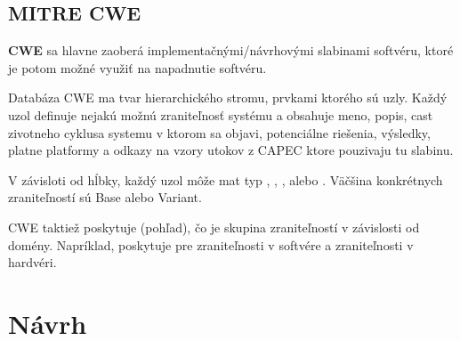 \documentclass[11pt]{article}
\begin{document}
\subsection{MITRE CWE}

\textbf{CWE} sa hlavne zaoberá implementačnými/návrhovými slabinami softvéru, ktoré je potom možné využiť na napadnutie softvéru.

Databáza CWE ma tvar hierarchického stromu, prvkami ktorého sú uzly. Každý uzol definuje nejakú možnú zraniteľnosť systému a obsahuje meno, popis, cast zivotneho cyklusa systemu v ktorom sa objavi, potenciálne riešenia, výsledky, platne platformy a odkazy na vzory utokov z CAPEC ktore pouzivaju tu slabinu.

V závisloti od hĺbky, každý uzol môže mat typ , , , alebo . Väčšina konkrétnych zraniteľností sú Base alebo Variant.

CWE taktiež poskytuje  (pohľad), čo je skupina zraniteľností v závislosti od domény. Napríklad, poskytuje  pre zraniteľnosti v softvére a zraniteľnosti v hardvéri.

\section{Návrh}
\end{document}
